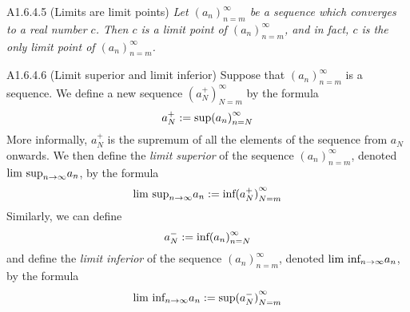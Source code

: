 \begin{proposition}{A1.6.4.5}
    (Limits are limit points) \emph{Let $(a_n)_{n=m}^{\infty}$ be a sequence which
    converges to a real number $c$. Then $c$ is a limit point of $(a_n)_{n=m}^{\infty}$,
    and in fact, $c$ is the only limit point of $(a_n)_{n=m}^{\infty}$.}
\end{proposition}

\begin{definition}{A1.6.4.6}
    (Limit superior and limit inferior) Suppose that $(a_n)_{n=m}^{\infty}$ is a
    sequence. We define a new sequence $(a_N^+)_{N=m}^{\infty}$ by the formula
    \begin{equation*}
        a_N^+ := \text{sup}{(a_n)}_{n=N}^{\infty}
    \end{equation*}
    More informally, $a_N^+$ is the supremum of all the elements of the sequence
    from $a_N$ onwards. We then define the \emph{limit superior} of the sequence
    $(a_n)_{n=m}^{\infty}$, denoted $\text{lim sup}_{n \rightarrow \infty}{a_n}$, by the formula
    \begin{equation*}
        \text{lim sup}_{n \rightarrow \infty}{a_n} := \text{inf}{(a_N^+)}_{N=m}^{\infty}
    \end{equation*}
    Similarly, we can define
    \begin{equation*}
        a_N^- := \text{inf}{(a_n)}_{n=N}^{\infty}
    \end{equation*}
    and define the \emph{limit inferior} of the sequence $(a_n)_{n=m}^{\infty}$,
    denoted $\text{lim inf}_{n \rightarrow \infty}{a_n}$, by the formula
    \begin{equation*}
        \text{lim inf}_{n \rightarrow \infty}{a_n} := \text{sup}{(a_N^-)}_{N=m}^{\infty}
    \end{equation*}
\end{definition}

